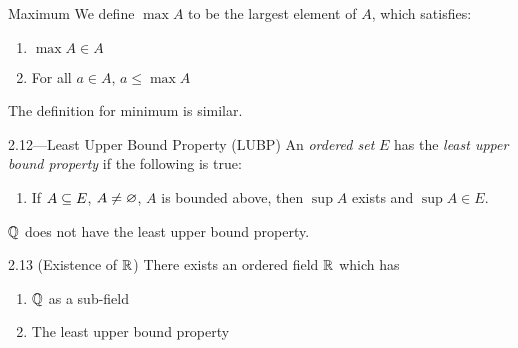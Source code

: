 \documentclass[class=article, crop=false]{standalone}
\begin{document}
  \begin{definition}{Maximum}
    We define $\max A$ to be the largest element of $A$, which satisfies:
    \begin{enumerate}[label=\roman*)]
      \item $\max A\in A$
      \item For all $a\in A$, $a \leq \max A$
    \end{enumerate}
    The definition for minimum is similar.
  \end{definition}
  \begin{definition}{2.12---Least Upper Bound Property (LUBP)}
    An \emph{ordered set} $E$ has the \emph{least upper bound property} if the following is true:
    \begin{enumerate}[label=\roman*)]
      \item If $A\subseteq E$, $A\neq\varnothing$, $A$ is bounded above, then $\sup A$ exists and $\sup A\in E$.
    \end{enumerate}
  \end{definition}
  \begin{note}{}
    $\mathbb{Q}$ does not have the least upper bound property.
  \end{note}
  \begin{theorem}{2.13 (Existence of $\mathbb{R}$)}
    There exists an ordered field $\mathbb{R}$ which has
    \begin{enumerate}[label=\roman*)]
      \item $\mathbb{Q}$ as a sub-field
      \item The least upper bound property
    \end{enumerate}
  \end{theorem}
\end{document}
